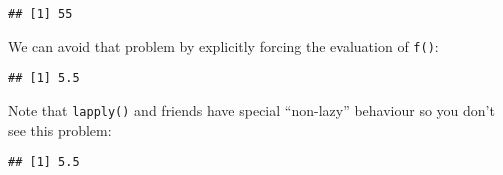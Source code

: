 \begin{verbatim}
## [1] 55
\end{verbatim}

We can avoid that problem by explicitly forcing the evaluation of
\texttt{f()}:

\begin{Shaded}
\begin{Highlighting}[]
\StringTok{ }
\NormalTok{  \}}
\NormalTok{\}}

\StringTok{ }\NormalTok{(}\NormalTok{, }
 
\StringTok{ } \NormalTok{)}
\NormalTok{\}}
\OperatorTok{$}\NormalTok{(}\OperatorTok{:}\NormalTok{)}
\end{Highlighting}
\end{Shaded}

\begin{verbatim}
## [1] 5.5
\end{verbatim}

Note that \texttt{lapply()} and friends have special ``non-lazy''
behaviour so you don't see this problem:

\begin{Shaded}
\begin{Highlighting}[]
\StringTok{ }
\NormalTok{  \}}
\NormalTok{\}}

\StringTok{ } \NormalTok{)}
\OperatorTok{$}\NormalTok{(}\OperatorTok{:}\NormalTok{)}
\end{Highlighting}
\end{Shaded}

\begin{verbatim}
## [1] 5.5
\end{verbatim}

